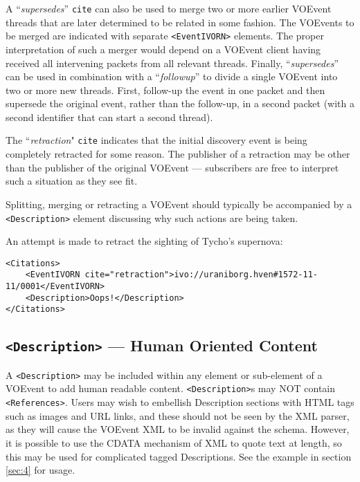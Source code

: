 \documentclass[11pt,a4paper]{ivoa}
\begin{document}
A ``\emph{supersedes}'' {\tt cite} can also be used to merge two or more earlier
VOEvent threads that are later determined to be related in some fashion. The
VOEvents to be merged are indicated with separate {\tt <EventIVORN>} elements.
The proper interpretation of such a merger would depend on a VOEvent client
having received all intervening packets from all relevant threads. Finally,
``\emph{supersedes}'' can be used in combination with a ``\emph{followup}'' to
divide a single VOEvent into two or more new threads. First, follow-up the event
in one packet and then supersede the original event, rather than the follow-up,
in a second packet (with a second identifier that can start a second thread).

The ``\emph{retraction}" {\tt cite} indicates that the initial discovery event
is being completely retracted for some reason. The publisher of a retraction may
be other than the publisher of the original VOEvent --- subscribers are free to
interpret such a situation as they see fit.

Splitting, merging or retracting a VOEvent should typically be accompanied by a
{\tt <Description>} element discussing why such actions are being taken.

An attempt is made to retract the sighting of Tycho's supernova:
\begin{lstlisting}
<Citations>
    <EventIVORN cite="retraction">ivo://uraniborg.hven#1572-11-11/0001</EventIVORN>
    <Description>Oops!</Description>
</Citations>
\end{lstlisting}

\subsection{{\tt <Description>} --- Human Oriented Content}
\label{sec:3.8}
A {\tt <Description>} may be included within any element or sub-element of a
VOEvent to add human readable content. {\tt <Description>}s may NOT contain {\tt
<References>}. Users may wish to embellish Description sections with HTML tags
such as images and URL links, and these should not be seen by the XML parser, as
they will cause the VOEvent XML to be invalid against the schema. However, it is
possible to use the CDATA mechanism of XML to quote text at length, so this may
be used for complicated tagged Descriptions. See the example in section
\ref{sec:4} for usage.
\end{document}
